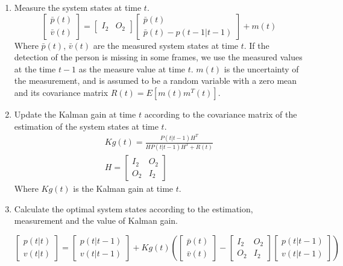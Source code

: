 \begin{enumerate}
	\item Measure the system states at time \(t\). 
	\begin{equation}
	 \begin{bmatrix}
	 \bar p(t) \\
	 \bar v(t)
	 \end{bmatrix}
	 = 
	 \begin{bmatrix}
	I_2&O_2
	\end{bmatrix}
	\begin{bmatrix}
	\bar p(t) \\
	\bar p(t) - p(t-1|t-1)
	\end{bmatrix}
	+m(t)
	\end{equation}
	Where \(\bar p(t)\), \(\bar v(t)\) are the measured system states at time \(t\). If the detection of the person is missing in some frames, we use the measured values at the time \(t-1\) as the measure value at time \(t\).    \(m(t)\) is the uncertainty of the measurement, and is assumed to be a random variable with a zero mean and its covariance matrix \(R(t) = E[m(t)m^T(t)]\).
	
	\item Update the Kalman gain at time \(t\) according to the covariance matrix of the estimation of the system states at time \(t\).
	\begin{eqnarray}
	Kg(t) = \frac{P(t|t-1) H^T}{HP(t|t-1) H^T + R(t)} \\
	H = 
	\begin{bmatrix}
	I_2&O_2 \\
	O_2&I_2
	\end{bmatrix}
	\end{eqnarray}
	Where \(Kg(t)\) is the Kalman gain at time \(t\).
	
	\item Calculate the optimal system states according to the estimation, measurement and the value of Kalman gain.
	 	
	\begin{equation}
	\begin{bmatrix}
	p(t|t) \\
	v(t|t)
	\end{bmatrix}
     =
     \begin{bmatrix}
     p(t|t-1) \\
     v(t|t-1)
     \end{bmatrix} + Kg(t) \left(
     \begin{bmatrix}
     \bar p(t) \\
     \bar v(t)
     \end{bmatrix} - 
     \begin{bmatrix}
     I_2&O_2 \\
     O_2&I_2
     \end{bmatrix}
      \begin{bmatrix}
     p(t|t-1) \\
     v(t|t-1)
     \end{bmatrix} \right)
	\end{equation}
	

\end{enumerate}

